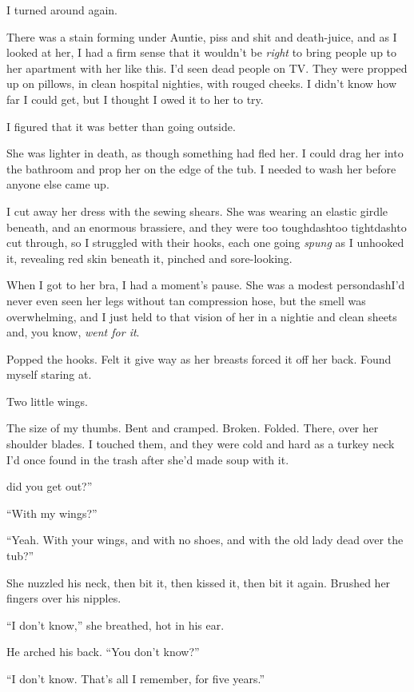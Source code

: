 I turned around again.

There was a stain forming under Auntie, piss and shit and death-juice,
and as I looked at her, I had a firm sense that it wouldn't be
\textit{right} to bring people up to her apartment with her like this. 
I'd seen dead people on TV.  They were propped up on pillows, in clean
hospital nighties, with rouged cheeks.  I didn't know how far I could
get, but I thought I owed it to her to try.

I figured that it was better than going outside.

She was lighter in death, as though something had fled her.  I could
drag her into the bathroom and prop her on the edge of the tub.  I
needed to wash her before anyone else came up.

I cut away her dress with the sewing shears.  She was wearing an
elastic girdle beneath, and an enormous brassiere, and they were too
toughdash{}too tightdash{}to cut through, so I struggled with their hooks,
each one going \textit{spung} as I unhooked it, revealing red skin
beneath it, pinched and sore-looking.

When I got to her bra, I had a moment's pause.  She was a modest
persondash{}I'd never even seen her legs without tan compression hose,
but the smell was overwhelming, and I just held to that vision of her
in a nightie and clean sheets and, you know, \textit{went for it}.

Popped the hooks.  Felt it give way as her breasts forced it off her
back.  Found myself staring at.

Two little wings.

The size of my thumbs.  Bent and cramped.  Broken.  Folded.  There,
over her shoulder blades.  I touched them, and they were cold and hard
as a turkey neck I'd once found in the trash after she'd made soup
with it.

did you get out?''

``With my wings?''

``Yeah.  With your wings, and with no shoes, and with the old lady
dead over the tub?''

She nuzzled his neck, then bit it, then kissed it, then bit it again. 
Brushed her fingers over his nipples.

``I don't know,'' she breathed, hot in his ear.

He arched his back.  ``You don't know?''

``I don't know.  That's all I remember, for five years.''

